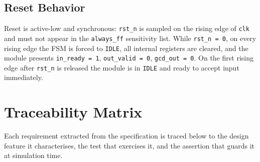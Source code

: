 \documentclass[11pt,a4paper]{article}
\begin{document}
\subsection*{Reset Behavior}

Reset is active-low and synchronous: \texttt{rst\_n} is sampled on the rising edge of
\texttt{clk} and must not appear in the \texttt{always\_ff} sensitivity list. While
\texttt{rst\_n = 0}, on every rising edge the FSM is forced to \texttt{IDLE}, all internal
registers are cleared, and the module presents \texttt{in\_ready = 1},
\texttt{out\_valid = 0}, \texttt{gcd\_out = 0}. On the first rising edge after
\texttt{rst\_n} is released the module is in \texttt{IDLE} and ready to accept input
immediately.

\section{Traceability Matrix}

Each requirement extracted from the specification is traced below to the design feature
it characterises, the test that exercises it, and
the assertion that guards it at simulation time.
\end{document}
